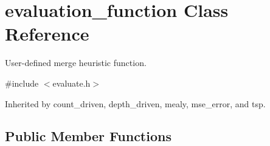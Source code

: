 \hypertarget{classevaluation__function}{}\section{evaluation\+\_\+function Class Reference}
\label{classevaluation__function}


User-\/defined merge heuristic function.  




{\ttfamily \#include $<$evaluate.\+h$>$}



Inherited by count\+\_\+driven, depth\+\_\+driven, mealy, mse\+\_\+error, and tsp.

\subsection*{Public Member Functions}
